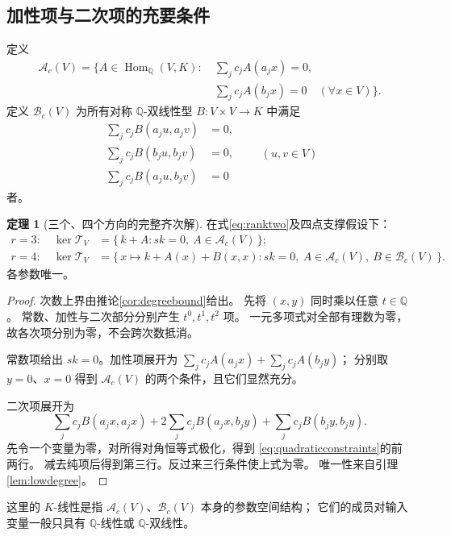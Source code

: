 \documentclass[UTF8,11pt,a4paper]{ctexart}
\theoremstyle{definition}
\newtheorem{theorem}{定理}[section]
\newcommand{\Q}{\mathbb Q}
\newcommand{\Hom}{\operatorname{Hom}}
\newcommand{\T}{\mathcal T}
\numberwithin{equation}{section}
\begin{document}
\subsection{加性项与二次项的充要条件}
定义
\[
 \begin{split}
 \mathcal A_c(V)=\{A\in\Hom_{\Q}(V,K):\
 &\sum_j c_jA(a_jx)=0,\\
 &\sum_j c_jA(b_jx)=0\quad(\forall x\in V)\}.
 \end{split}
\]
定义 $\mathcal B_c(V)$ 为所有对称 $\Q$-双线性型
$B:V\times V\to K$ 中满足
\begin{equation}\label{eq:quadraticconstraints}
 \begin{aligned}
 \sum_jc_jB(a_ju,a_jv)&=0,\\
 \sum_jc_jB(b_ju,b_jv)&=0,\\
 \sum_jc_jB(a_ju,b_jv)&=0
 \end{aligned}
 \qquad(u,v\in V)
\end{equation}
者。

\begin{theorem}[三个、四个方向的完整齐次解]\label{thm:exactlowkernel}
在式\eqref{eq:ranktwo}及四点支撑假设下：
\begin{align}
 r=3:\quad
 \ker\T_V&=\{\,k+A:sk=0,\ A\in\mathcal A_c(V)\,\};
 \label{eq:threekernel}\\
 r=4:\quad
 \ker\T_V&=\{\,x\mapsto k+A(x)+B(x,x):
 sk=0,\ A\in\mathcal A_c(V),\ B\in\mathcal B_c(V)\,\}.
 \label{eq:fourkernel}
\end{align}
各参数唯一。
\end{theorem}
\begin{proof}
次数上界由推论\ref{cor:degreebound}给出。
先将 $(x,y)$ 同时乘以任意 $t\in\Q$。
常数、加性与二次部分分别产生 $t^0,t^1,t^2$ 项。
一元多项式对全部有理数为零，故各次项分别为零，不会跨次数抵消。

常数项给出 $sk=0$。加性项展开为
$\sum_jc_jA(a_jx)+\sum_jc_jA(b_jy)$；
分别取 $y=0$、$x=0$ 得到 $\mathcal A_c(V)$ 的两个条件，且它们显然充分。

二次项展开为
\[
 \sum_jc_jB(a_jx,a_jx)
 +2\sum_jc_jB(a_jx,b_jy)
 +\sum_jc_jB(b_jy,b_jy).
\]
先令一个变量为零，对所得对角恒等式极化，得到
\eqref{eq:quadraticconstraints}的前两行。
减去纯项后得到第三行。反过来三行条件使上式为零。
唯一性来自引理\ref{lem:lowdegree}。
\end{proof}

这里的 $K$-线性是指 $\mathcal A_c(V)$、$\mathcal B_c(V)$ 本身的参数空间结构；
它们的成员对输入变量一般只具有 $\Q$-线性或 $\Q$-双线性。
\end{document}
